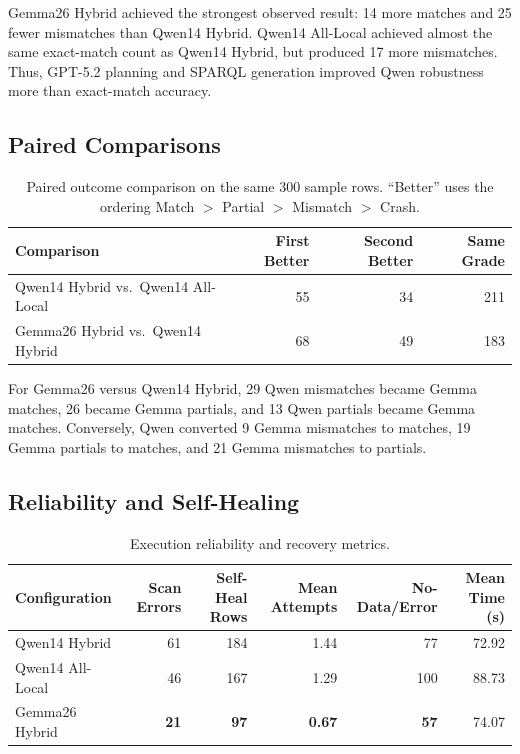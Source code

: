 \documentclass[11pt]{article}
\begin{document}
Gemma26 Hybrid achieved the strongest observed result: 14 more matches and 25 fewer mismatches than Qwen14 Hybrid. Qwen14 All-Local achieved almost the same exact-match count as Qwen14 Hybrid, but produced 17 more mismatches. Thus, GPT-5.2 planning and SPARQL generation improved Qwen robustness more than exact-match accuracy.

\subsection{Paired Comparisons}

\begin{table}[H]
\centering
\caption{Paired outcome comparison on the same 300 sample rows. ``Better'' uses the ordering Match $>$ Partial $>$ Mismatch $>$ Crash.}
\label{tab:paired}
\begin{tabular}{lrrr}
\toprule
\textbf{Comparison} & \textbf{First Better} & \textbf{Second Better} & \textbf{Same Grade}\\
\midrule
Qwen14 Hybrid vs.\ Qwen14 All-Local & 55 & 34 & 211\\
Gemma26 Hybrid vs.\ Qwen14 Hybrid & 68 & 49 & 183\\
\bottomrule
\end{tabular}
\end{table}

For Gemma26 versus Qwen14 Hybrid, 29 Qwen mismatches became Gemma matches, 26 became Gemma partials, and 13 Qwen partials became Gemma matches. Conversely, Qwen converted 9 Gemma mismatches to matches, 19 Gemma partials to matches, and 21 Gemma mismatches to partials.

\subsection{Reliability and Self-Healing}

\begin{table}[H]
\centering
\caption{Execution reliability and recovery metrics.}
\label{tab:reliability}
\begin{tabular}{lrrrrr}
\toprule
\textbf{Configuration} & \textbf{Scan Errors} & \textbf{Self-Heal Rows} &
\textbf{Mean Attempts} & \textbf{No-Data/Error} & \textbf{Mean Time (s)}\\
\midrule
Qwen14 Hybrid & 61 & 184 & 1.44 & 77 & 72.92\\
Qwen14 All-Local & 46 & 167 & 1.29 & 100 & 88.73\\
Gemma26 Hybrid & \textbf{21} & \textbf{97} & \textbf{0.67} & \textbf{57} & 74.07\\
\bottomrule
\end{tabular}
\end{table}
\end{document}
